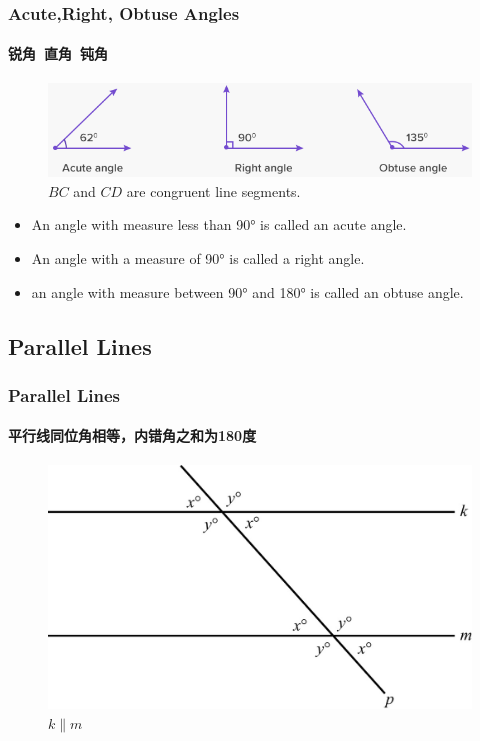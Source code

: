 \documentclass[
	11pt, %
]{beamer}
\begin{document}
\begin{frame}
	\frametitle{Acute,Right, Obtuse Angles} %
	\framesubtitle{锐角\ 直角\ 钝角}

		\begin{figure}
			\includegraphics[width=\linewidth]{Acute_Right_Obtuse.png}
			\caption{$BC$ and $CD$ are congruent line segments.}
		\end{figure}

		\begin{definition}
		\begin{itemize}
			\item An angle with measure less than 90° is called an \alert{acute angle}.
			\item An angle with a measure of 90° is called a \alert{right angle}.
			\item an angle with measure between 90° and 180° is called an \alert{obtuse angle}.
		\end{itemize}
		\end{definition}
\end{frame}


\subsection{Parallel Lines}


\begin{frame}
	\frametitle{Parallel Lines} %
	\framesubtitle{平行线同位角相等，内错角之和为180度}
		\begin{figure}
			\includegraphics[width=0.9\linewidth]{Parallel_Lines.jpg}
			\caption{$k \parallel m$}
		\end{figure}
\end{frame}
\end{document}
